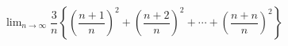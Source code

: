 \hspace*{2mm}\begin{minipage}[t]{\dimexpr\linewidth-2mm\relax}\vspace{0pt}
$\displaystyle\lim_{n\to\infty}\dfrac{3}{n}\left\{\left(\dfrac{n+1}{n}\right)^{2}+\left(\dfrac{n+2}{n}\right)^{2}+\cdots+\left(\dfrac{n+n}{n}\right)^{2}\right\}$\end{minipage}

